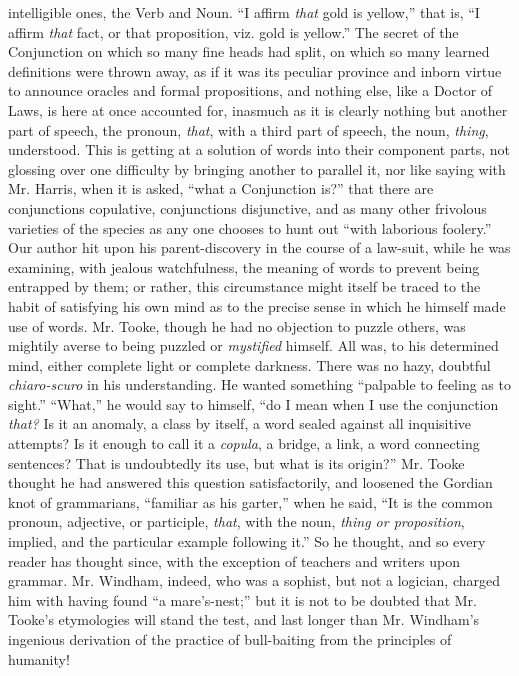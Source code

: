 intelligible ones, the Verb and Noun. ``I affirm \emph{that} gold is
yellow,'' that is, ``I affirm \emph{that} fact, or that proposition,
viz. gold is yellow.'' The secret of the Conjunction on which so
many fine heads had split, on which so many learned definitions
were thrown away, as if it was its peculiar province and inborn
virtue to announce oracles and formal propositions, and nothing
else, like a Doctor of Laws, is here at once accounted for,
inasmuch as it is clearly nothing but another part of speech, the
pronoun, \emph{that}, with a third part of speech, the noun, \emph{thing},
understood. This is getting at a solution of words into their
component parts, not glossing over one difficulty by bringing
another to parallel it, nor like saying with Mr. Harris, when it
is asked, ``what a Conjunction is?'' that there are conjunctions
copulative, conjunctions disjunctive, and as many other frivolous
varieties of the species as any one chooses to hunt out ``with
laborious foolery.'' Our author hit upon his parent-discovery in
the course of a law-suit, while he was examining, with jealous
watchfulness, the meaning of words to prevent being entrapped by
them; or rather, this circumstance might itself be traced to the
habit of satisfying his own mind as to the precise sense in which
he himself made use of words. Mr. Tooke, though he had no
objection to puzzle others, was mightily averse to being puzzled
or \emph{mystified} himself. All was, to his determined mind, either
complete light or complete darkness. There was no hazy, doubtful
\emph{chiaro-scuro} in his understanding. He wanted something ``palpable
to feeling as to sight.'' ``What,'' he would say to himself, ``do I
mean when I use the conjunction \emph{that?} Is it an anomaly, a class
by itself, a word sealed against all inquisitive attempts? Is it
enough to call it a \emph{copula}, a bridge, a link, a word connecting
sentences? That is undoubtedly its use, but what is its origin?''
Mr. Tooke thought he had answered this question satisfactorily,
and loosened the Gordian knot of grammarians, ``familiar as his
garter,'' when he said, ``It is the common pronoun, adjective, or
participle, \emph{that}, with the noun, \emph{thing or proposition},
implied, and the particular example following it.'' So he thought,
and so every reader has thought since, with the exception of
teachers and writers upon grammar. Mr. Windham, indeed, who was a
sophist, but not a logician, charged him with having found ``a
mare's-nest;'' but it is not to be doubted that Mr. Tooke's
etymologies will stand the test, and last longer than
Mr. Windham's ingenious derivation of the practice of bull-baiting
from the principles of humanity!


